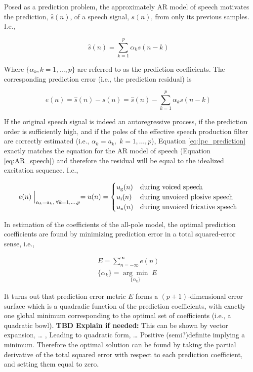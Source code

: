 Posed as a prediction problem, the approximately AR model of speech motivates the prediction, $\hat{s}(n)$, of a speech signal, $s(n)$, from only its previous samples. I.e.,

\begin{equation}
	\hat{s}(n) = \sum_{k=1}^{p}\alpha_k s(n-k) \label{eq:lpc_prediction}
\end{equation}

\noindent
Where $\{\alpha_k, k=1,\dots,p\}$ are referred to as the prediction coefficients. The corresponding prediction error (i.e., the prediction residual) is

\begin{equation}
	e(n)= \hat{s}(n)  - s(n) =  \hat{s}(n)  - \sum_{k=1}^{p}\alpha_k s(n-k) \label{eq:lpc_error}
\end{equation}


If the original speech signal is indeed an autoregressive process, if the prediction order is sufficiently high, and if the poles of the effective speech production filter are correctly estimated (i.e., $\alpha_k=a_k, \; k=1,\dots,p$), Equation \ref{eq:lpc_prediction} exactly matches the equation for the AR model of speech (Equation \ref{eq:AR_speech}) and therefore the residual will be equal to the idealized excitation sequence. I.e., 

\begin{equation}
	e(n)\Bigm|_{\alpha_k=a_k, \; \forall k=1,\dots,p} = u(n) = 
	\begin{cases} 
		u_\mathrm{g}(n) & \text{during voiced speech} \\
		u_\mathrm{i}(n)  & \text{during unvoiced plosive speech} \\
		u_\mathrm{n}(n) & \text{during unvoiced fricative speech} \\
	\end{cases}
\end{equation}

In estimation of the coefficients of the all-pole model, the optimal prediction coefficients are found by minimizing prediction error in a total squared-error sense, i.e.,

\begin{eqnarray}
	E = \sum_{n=-\infty}^{\infty}e(n) \\ 
	\{\alpha_k\} = \underset{\{\alpha_k\}}{\arg\min}\;E
\end{eqnarray}

\noindent
It turns out that prediction error metric $E$ forms a $(p+1)$-dimensional error surface which is a quadradic function of the prediction coefficients, with exactly one global minimum corresponding to the optimal set of coefficients (i.e., a quadratic bowl). \textbf{TBD Explain if needed:} This can be shown by vector expansion, … , Leading to quadratic form, … Positive (semi?)definite implying a minimum. Therefore the optimal solution can be found by taking the partial derivative of the total squared error with respect to each prediction coefficient, and setting them equal to zero.


